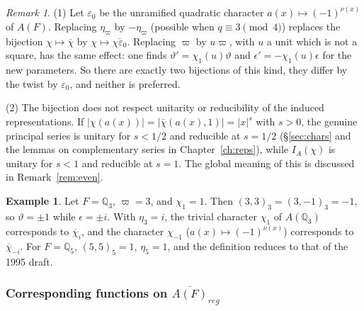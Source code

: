 \documentclass[12pt,letterpaper,openany]{book}
\theoremstyle{plain}
\theoremstyle{definition}
\newtheorem{example}[theorem]{Example}
\theoremstyle{remark}
\newtheorem{remark}[theorem]{Remark}
\theoremstyle{remark}
\begin{document}
\begin{remark}\label{rem:choices}
(1) Let $\varepsilon_0$ be the unramified quadratic character
$a(x)\mapsto(-1)^{\nu(x)}$ of $A(F)$. Replacing $\eta_\varpi$ by
$-\eta_\varpi$ (possible when $q\equiv3\pmod4$) replaces the bijection
$\chi\mapsto\overline\chi$ by $\chi\mapsto\overline{\chi\varepsilon_0}$.
Replacing $\varpi$ by $u\varpi$, with $u$ a unit which is not a square,
has the same effect: one finds $\vartheta'=\chi_1(u)\vartheta$ and
$\epsilon'=-\chi_1(u)\epsilon$ for the new parameters. So there are exactly
two bijections of this kind, they differ by the twist by $\varepsilon_0$,
and neither is preferred.

(2) The bijection does not respect unitarity or reducibility of the
induced representations. If $|\chi(a(x))|=|\overline\chi(a(x),1)|=|x|^s$
with $s>0$, the genuine principal series is unitary for $s<1/2$ and
reducible at $s=1/2$ (\S\ref{sec:chars} and the lemmas on complementary
series in Chapter~\ref{ch:reps}), while $I_A(\chi)$ is unitary for $s<1$
and reducible at $s=1$. The global meaning of this is discussed in
Remark~\ref{rem:even}.
\end{remark}

\begin{example}
Let $F={\mathbb Q}_3$, $\varpi=3$, and $\chi_1=1$. Then
$(3,3)_3=(3,-1)_3=-1$, so $\vartheta=\pm1$ while $\epsilon=\pm i$. With
$\eta_3=i$, the trivial character $\chi_{1}$ of $A({\mathbb Q}_3)$
corresponds to $\overline{\chi}_i$, and the character $\chi_{-1}$
($a(x)\mapsto(-1)^{\nu(x)}$) corresponds to $\overline{\chi}_{-i}$. For
$F={\mathbb Q}_5$, $(5,5)_5=1$, $\eta_5=1$, and the definition reduces to
that of the 1995 draft.
\end{example}

\subsubsection{Corresponding functions on \texorpdfstring{$\overline{A(F)}_{reg}$}{A(F)-bar_reg}}
\end{document}
